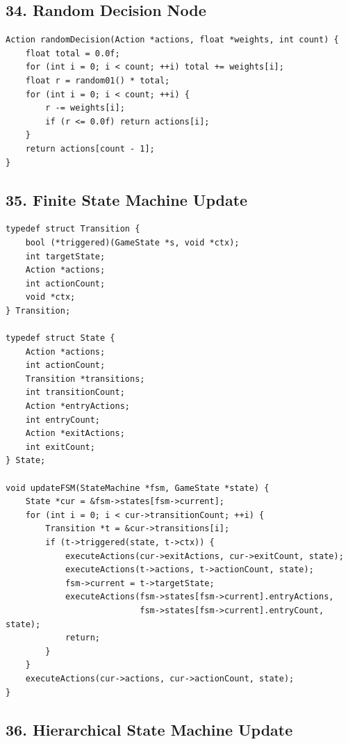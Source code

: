 \documentclass[10pt,letterpaper]{article}
\begin{document}
\subsection*{34. Random Decision Node}
{}

\begin{verbatim}
Action randomDecision(Action *actions, float *weights, int count) {
    float total = 0.0f;
    for (int i = 0; i < count; ++i) total += weights[i];
    float r = random01() * total;
    for (int i = 0; i < count; ++i) {
        r -= weights[i];
        if (r <= 0.0f) return actions[i];
    }
    return actions[count - 1];
}
\end{verbatim}

\subsection*{35. Finite State Machine Update}
{}

\begin{verbatim}
typedef struct Transition {
    bool (*triggered)(GameState *s, void *ctx);
    int targetState;
    Action *actions;
    int actionCount;
    void *ctx;
} Transition;

typedef struct State {
    Action *actions;
    int actionCount;
    Transition *transitions;
    int transitionCount;
    Action *entryActions;
    int entryCount;
    Action *exitActions;
    int exitCount;
} State;

void updateFSM(StateMachine *fsm, GameState *state) {
    State *cur = &fsm->states[fsm->current];
    for (int i = 0; i < cur->transitionCount; ++i) {
        Transition *t = &cur->transitions[i];
        if (t->triggered(state, t->ctx)) {
            executeActions(cur->exitActions, cur->exitCount, state);
            executeActions(t->actions, t->actionCount, state);
            fsm->current = t->targetState;
            executeActions(fsm->states[fsm->current].entryActions,
                           fsm->states[fsm->current].entryCount, state);
            return;
        }
    }
    executeActions(cur->actions, cur->actionCount, state);
}
\end{verbatim}

\subsection*{36. Hierarchical State Machine Update}
{}
\end{document}
